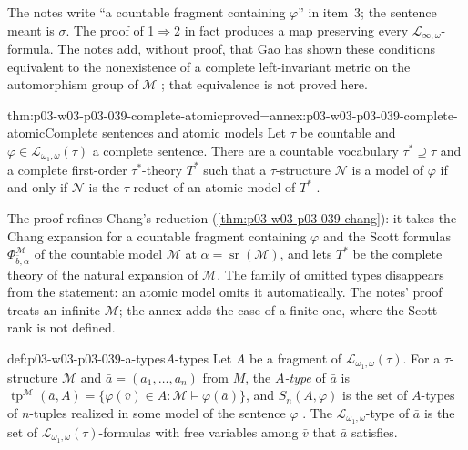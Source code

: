 The notes write ``a countable fragment containing \(\varphi\)'' in item~3;
the sentence meant is \(\sigma\). The proof of 1\(\Rightarrow\)2 in fact
produces a map preserving every \(\mathcal L_{\infty,\omega}\)-formula. The
notes add, without proof, that Gao has shown these conditions equivalent to
the nonexistence of a complete left-invariant metric on the automorphism
group of \(\mathcal M\) \cite[p.~21]{Marker2014InfinitaryNotes}; that
equivalence is not proved here.

\begin{hbtheorem}{thm:p03-w03-p03-039-complete-atomic}{proved=annex:p03-w03-p03-039-complete-atomic}{Complete sentences and atomic models}
Let \(\tau\) be countable and \(\varphi\in\mathcal L_{\omega_1,\omega}(\tau)\)
a complete sentence. There are a countable vocabulary \(\tau^*\supseteq\tau\)
and a complete first-order \(\tau^*\)-theory \(T^*\) such that a
\(\tau\)-structure \(\mathcal N\) is a model of \(\varphi\) if and only if
\(\mathcal N\) is the \(\tau\)-reduct of an atomic model of \(T^*\)
\cite[Thm.~2.32, p.~21]{Marker2014InfinitaryNotes}.
\end{hbtheorem}

The proof refines Chang's reduction (\cref{thm:p03-w03-p03-039-chang}): it
takes the Chang expansion for a countable fragment containing \(\varphi\)
and the Scott formulas \(\Phi^{\mathcal M}_{\bar b,\alpha}\) of the countable
model \(\mathcal M\) at \(\alpha=\operatorname{sr}(\mathcal M)\), and lets
\(T^*\) be the complete theory of the natural expansion of \(\mathcal M\).
The family of omitted types disappears from the statement: an atomic model
omits it automatically. The notes' proof treats an infinite \(\mathcal M\);
the annex adds the case of a finite one, where the Scott rank is not
defined.

\begin{hbdefinition}{def:p03-w03-p03-039-a-types}{\(A\)-types}
Let \(A\) be a fragment of \(\mathcal L_{\omega_1,\omega}(\tau)\). For a
\(\tau\)-structure \(\mathcal M\) and \(\bar a=(a_1,\ldots,a_n)\) from \(M\),
the \emph{\(A\)-type} of \(\bar a\) is
\(\operatorname{tp}^{\mathcal M}(\bar a,A)=\{\varphi(\bar v)\in A:\mathcal M\models\varphi(\bar a)\}\),
and \(S_n(A,\varphi)\) is the set of \(A\)-types of \(n\)-tuples realized in
some model of the sentence \(\varphi\)
\cite[Def.~2.33, p.~22]{Marker2014InfinitaryNotes}. The
\(\mathcal L_{\omega_1,\omega}\)-type of \(\bar a\) is the set of
\(\mathcal L_{\omega_1,\omega}(\tau)\)-formulas with free variables among
\(\bar v\) that \(\bar a\) satisfies.
\end{hbdefinition}

